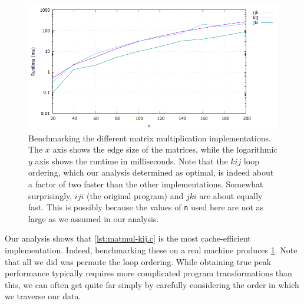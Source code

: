 \begin{figure}
  \centering
    \includegraphics[width=\linewidth]{img/matmul.png}
    \caption{Benchmarking the different matrix multiplication
      implementations.  The $x$ axis shows the edge size of the
      matrices, while the logarithmic $y$ axis shows the runtime in
      milliseconds.  Note that the $kij$ loop ordering, which our
      analysis determined as optimal, is indeed about a factor of two
      faster than the other implementations.  Somewhat surprisingly,
      $iji$ (the original program) and $jki$ are about equally fast.
      This is possibly because the values of \texttt{n} used here are
      not as large as we assumed in our analysis.}
  \label{fig:matmul-graph}
\end{figure}

Our analysis shows that \cref{lst:matmul-kij.c} is the most
cache-efficient implementation.  Indeed, benchmarking these on a real
machine produces \cref{fig:matmul-graph}.  Note that all we did was
permute the loop ordering.  While obtaining true peak performance
typically requires more complicated program transformations than this,
we can often get quite far simply by carefully considering the order
in which we traverse our data.

